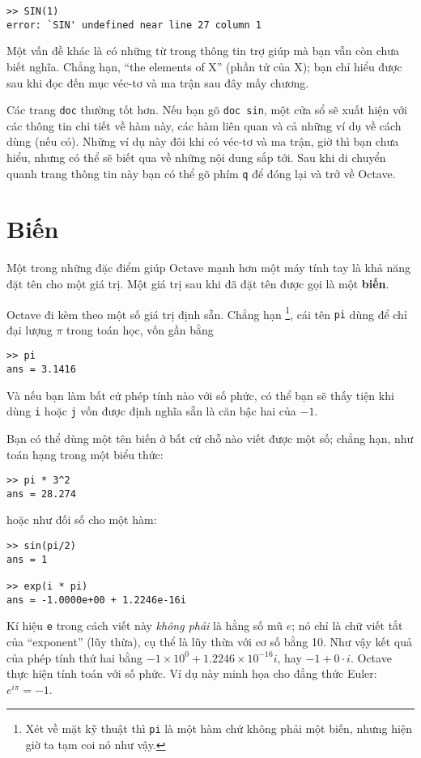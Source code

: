 \documentclass[12pt]{book}
\begin{document}
\begin{verbatim}
>> SIN(1)
error: `SIN' undefined near line 27 column 1
\end{verbatim}
%
Một vấn đề khác là có những từ trong thông tin trợ giúp mà bạn vẫn
còn chưa biết nghĩa. Chẳng hạn, ``the elements of X'' (phần tử của X);
bạn chỉ hiểu được sau khi đọc đến mục véc-tơ và ma trận sau đây
mấy chương.

Các trang \texttt{doc} thường tốt hơn. Nếu bạn gõ {\tt doc sin}, một
cửa sổ sẽ xuất hiện với các thông tin chi tiết về hàm này, các hàm liên quan 
và cả những ví dụ về cách dùng (nếu có). Những ví dụ này đôi khi có véc-tơ
và ma trận, giờ thì bạn chưa hiểu, nhưng có thể sẽ biết qua về những
nội dung sắp tới. Sau khi di chuyển quanh trang thông tin này bạn có thể
gõ phím \texttt{q} để đóng lại và trở về Octave.


\section{Biến}

Một trong những đặc điểm giúp Octave mạnh hơn một máy tính tay
là khả năng đặt tên cho một giá trị. Một giá trị sau khi đã đặt tên
được gọi là một {\bf biến}.

Octave đi kèm theo một số giá trị định sẵn. Chẳng hạn
\footnote{Xét về mặt kỹ thuật thì {\tt pi} là một hàm chứ không phải
một biến, nhưng hiện giờ ta tạm coi nó như vậy.}, cái tên {\tt pi} dùng để chỉ
đại lượng $\pi$ trong toán học, vốn gần bằng

\begin{verbatim}
>> pi
ans = 3.1416
\end{verbatim}
%
Và nếu bạn làm bất cứ phép tính nào với số phức, có thể bạn sẽ thấy tiện
khi dùng {\tt i} hoặc {\tt j} vốn được định nghĩa sẵn là căn bậc hai 
của $-1$.

Bạn có thể dùng một tên biến ở bất cứ chỗ nào viết được một số; chẳng hạn,
như toán hạng trong một biểu thức:

\begin{verbatim}
>> pi * 3^2
ans = 28.274
\end{verbatim}
%
hoặc như đối số cho một hàm:

\begin{verbatim}
>> sin(pi/2)
ans = 1

>> exp(i * pi)
ans = -1.0000e+00 + 1.2246e-16i
\end{verbatim}
%
Kí hiệu {\tt e} trong cách viết này {\em không phải} là hằng số mũ 
$e$; nó chỉ là chữ viết tắt của ``exponent'' (lũy thừa), cụ thể là
lũy thừa với cơ số bằng 10. Như vậy kết quả của phép tính thứ hai
bằng $-1 \times 10^0 + 1.2246 \times 10^{-16} i $, hay 
$-1 + 0 \cdot i $. 
Octave thực hiện tính toán với số phức. Ví dụ này minh họa cho đẳng thức Euler:
$e^{i \pi} = -1$.
\end{document}
